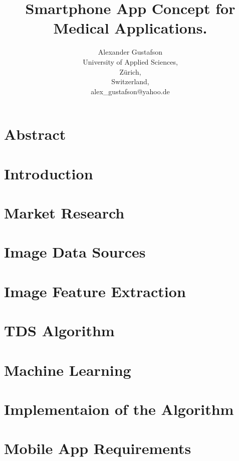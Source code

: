 \documentclass{report}
\title{Smartphone App Concept for Medical Applications.}
\author{Alexander Gustafson\\
  University of Applied Sciences,\\
  Zürich,\\
  Switzerland,\\
  alex\_gustafson@yahoo.de}
\date{\parbox{\linewidth}{\centering%
  \today\endgraf\bigskip
  Dozent: Reto Knaack (knaa@zhaw.ch)\endgraf\bigskip
  School of Engineering, Abteilung Zürich \endgraf
  Studiengang Informatik\endgraf
  }}
\begin{document}
\maketitle

\chapter*{Abstract}


\tableofcontents

\chapter{Introduction}


\chapter{Market Research}


\chapter{Image Data Sources}


\chapter{Image Feature Extraction}


\chapter{TDS Algorithm}


\chapter{Machine Learning}


\chapter{Implementaion of the Algorithm}


\chapter{Mobile App Requirements}

\end{document}

